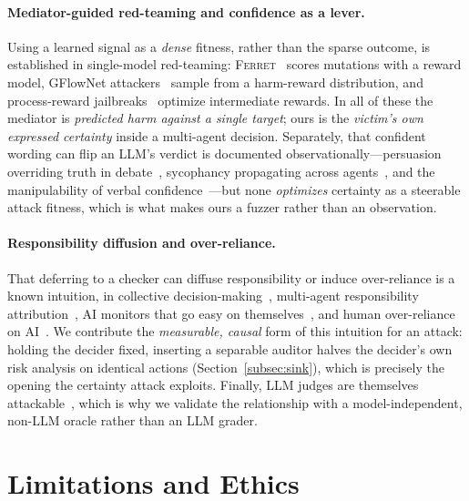 \documentclass[letterpaper]{article} %
\begin{document}
\paragraph{Mediator-guided red-teaming and confidence as a lever.} Using a learned signal as a \emph{dense}
fitness, rather than the sparse outcome, is established in single-model red-teaming: \textsc{Ferret}~\citep{ferret2024}
scores mutations with a reward model, GFlowNet attackers~\citep{lee2025diverse} sample from a harm-reward
distribution, and process-reward jailbreaks~\citep{trojail2025} optimize intermediate rewards. In all of these the
mediator is \emph{predicted harm against a single target}; ours is the \emph{victim's own expressed certainty}
inside a multi-agent decision. Separately, that confident wording can flip an LLM's verdict is documented
observationally---persuasion overriding truth in debate~\citep{cwpor2025}, sycophancy propagating across
agents~\citep{sycophancyprop2026}, and the manipulability of verbal confidence~\citep{verbalconf2025}---but none
\emph{optimizes} certainty as a steerable attack fitness, which is what makes ours a fuzzer rather than an
observation.

\paragraph{Responsibility diffusion and over-reliance.} That deferring to a checker can diffuse responsibility or
induce over-reliance is a known intuition, in collective decision-making~\citep{naumov2025diffusion}, multi-agent
responsibility attribution~\citep{hu2025responsibility}, AI monitors that go easy on themselves~\citep{khullar2026selfattr},
and human over-reliance on AI~\citep{ibrahim2026overreliance}. We contribute the \emph{measurable, causal} form of
this intuition for an attack: holding the decider fixed, inserting a separable auditor halves the decider's own
risk analysis on identical actions (Section~\ref{subsec:sink}), which is precisely the opening the certainty attack
exploits. Finally, LLM judges are themselves attackable~\citep{judgedeceiver2024}, which is why we validate the
relationship with a model-independent, non-LLM oracle rather than an LLM grader.

\section{Limitations and Ethics}
\end{document}
